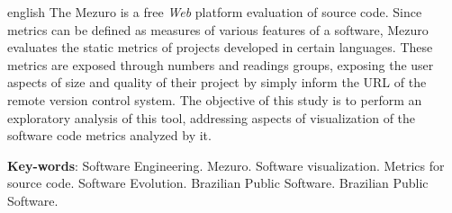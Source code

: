 \begin{resumo}[Abstract]
 \begin{otherlanguage*}{english}
   The Mezuro is a free \textit{Web} platform evaluation of source code. Since
   metrics can be defined as measures of various features of a software, Mezuro
   evaluates the static metrics of projects developed in certain languages.
   These metrics are exposed through numbers and readings groups, exposing the
   user aspects of size and quality of their project by simply inform the URL of
   the remote version control system. The objective of this study is to perform
   an exploratory analysis of this tool, addressing aspects of visualization of
   the software code metrics analyzed by it.

   \vspace{\onelineskip}

   \noindent
   \textbf{Key-words}: Software Engineering. Mezuro. Software visualization.
   Metrics for source code. Software Evolution. Brazilian Public Software.
   Brazilian Public Software.
 \end{otherlanguage*}
\end{resumo}

